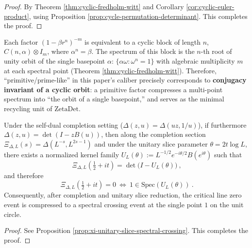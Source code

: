 \begin{proof}
By Theorem \ref{thm:cyclic-fredholm-witt} and Corollary \ref{cor:cyclic-euler-product}, using Proposition \ref{prop:cycle-permutation-determinant}. This completes the proof.
\end{proof}

\begin{corollary}[Euler factor = single-basepoint unit root orbit (primitive atom)]\label{cor:discussion-euler-factor-is-basepoint-orbit}
Each factor \((1-\beta r^{n})^{-m}\) is equivalent to a cyclic block of length \(n\), \(C(n,\alpha)\otimes I_m\), where \(\alpha^n=\beta\).
The spectrum of this block is the \(n\)-th root of unity orbit of the single basepoint \(\alpha\):
\(
\{\alpha\omega:\omega^n=1\}
\)
with algebraic multiplicity \(m\) at each spectral point (Theorem \ref{thm:cyclic-fredholm-witt}).
Therefore, ``primitive/prime-like'' in this paper's caliber precisely corresponds to \textbf{conjugacy invariant of a cyclic orbit}: a primitive factor compresses a multi-point spectrum into ``the orbit of a single basepoint,'' and serves as the minimal recycling unit of \(\mathrm{ZetaDet}\).
\end{corollary}

\begin{theorem}\label{thm:discussion-critical-line-single-point-crossing}
Under the self-dual completion setting (\(\Delta(z,u)=\Delta(uz,1/u)\)), if furthermore \(\Delta(z,u)=\det(I-zB(u))\), then along the completion section
\(
\Xi_{\Delta,L}(s)=\Delta(L^{-s},L^{2s-1})
\)
and under the unitary slice parameter \(\theta=2t\log L\), there exists a normalized kernel family
\(
U_L(\theta):=L^{-1/2}e^{-i\theta/2}B(e^{i\theta})
\)
such that
\[
\boxed{\ \Xi_{\Delta,L}\!\left(\tfrac12+it\right)=\det\!\bigl(I-U_L(\theta)\bigr)\ },
\]
and therefore
\[
\boxed{\ \Xi_{\Delta,L}\!\left(\tfrac12+it\right)=0\ \Longleftrightarrow\ 1\in\mathrm{Spec}(U_L(\theta))\ }.
\]
Consequently, after completion and unitary slice reduction, the critical line zero event is compressed to a spectral crossing event at the single point \(1\) on the unit circle.
\end{theorem}

\begin{proof}
See Proposition \ref{prop:xi-unitary-slice-spectral-crossing}. This completes the proof.
\end{proof}

